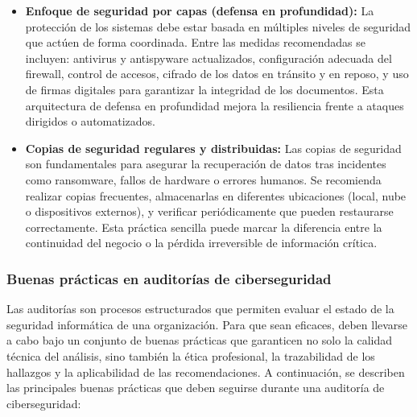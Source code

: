 \documentclass[a4paper, 10pt]{article}
\begin{document}
\begin{itemize}
        \item \textbf{Enfoque de seguridad por capas (defensa en profundidad):}  
        La protección de los sistemas debe estar basada en múltiples niveles de seguridad que actúen de forma coordinada. Entre las medidas recomendadas se incluyen: 
        antivirus y antispyware actualizados, configuración adecuada del firewall, control de accesos, cifrado de los datos en tránsito y en reposo, y uso de firmas digitales para garantizar la integridad de los documentos. Esta arquitectura de defensa en profundidad mejora la resiliencia frente a ataques dirigidos o automatizados.
    
        \item \textbf{Copias de seguridad regulares y distribuidas:}  
        Las copias de seguridad son fundamentales para asegurar la recuperación de datos tras incidentes como ransomware, fallos de hardware o errores humanos. Se recomienda realizar copias frecuentes, almacenarlas en diferentes ubicaciones (local, nube o dispositivos externos), y verificar periódicamente que pueden restaurarse correctamente. Esta práctica sencilla puede marcar la diferencia entre la continuidad del negocio o la pérdida irreversible de información crítica.
    
    \end{itemize}
    
    \subsubsection{Buenas prácticas en auditorías de ciberseguridad}

    Las auditorías son procesos estructurados que permiten evaluar el estado de la seguridad informática de una organización. 
    Para que sean eficaces, deben llevarse a cabo bajo un conjunto de buenas prácticas que garanticen no solo la calidad técnica del análisis, sino también la ética profesional, 
    la trazabilidad de los hallazgos y la aplicabilidad de las recomendaciones. A continuación, se describen las principales buenas prácticas que deben seguirse durante una auditoría de ciberseguridad:
    
\end{document}
